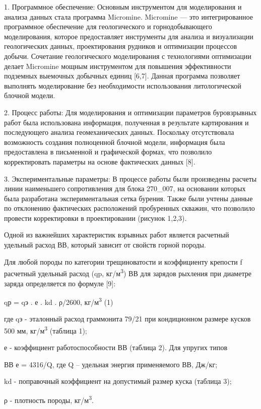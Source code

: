 \begin{multicols}{2}
1. Программное обеспечение: Основным инструментом для моделирования и
анализа данных стала программа Micromine. Micromine --- это
интегрированное программное обеспечение для геологического и
горнодобывающего моделирования, которое предоставляет инструменты для
анализа и визуализации геологических данных, проектирования рудников и
оптимизации процессов добычи. Сочетание геологического моделирования с
технологиями оптимизации делает Micromine мощным инструментом для
повышения эффективности подземных выемочных добычных единиц {[}6,7{]}.
Данная программа позволяет выполнять моделирование без необходимости
использования литологической блочной модели.

2. Процесс работы: Для моделирования и оптимизации параметров
буровзрывных работ была использована информация, полученная в результате
картирования и последующего анализа геомеханических данных. Поскольку
отсутствовала возможность создания полноценной блочной модели,
информация была предоставлена в письменной и графической формах, что
позволило корректировать параметры на основе фактических данных {[}8{]}.

3. Экспериментальные параметры: В процессе работы были произведены
расчеты линии наименьшего сопротивления для блока 270\_007, на основании
которых была разработана экспериментальная сетка бурения. Также были
учтены данные по отклонению фактических расположений пробуренных
скважин, что позволило провести корректировки в проектировании (рисунок
1,2,3).

Одной из важнейших характеристик взрывных работ является расчетный
удельный расход ВВ, который зависит от свойств горной породы.

Для любой породы по категории трещиноватости и коэффициенту крепости f
расчетный удельный расход (qp, кг/м\textsuperscript{3}) ВВ для зарядов
рыхления при диаметре заряда определяется по формуле {[}9{]}:

\hspace{1em} qр = qэ . е . kd . ρ/2600, кг/м\textsuperscript{3} (1)

где qэ - эталонный расход граммонита 79/21 при кондиционном размере
кусков 500 мм, кг/м\textsuperscript{3} (таблица 1);

е - коэффициент работоспособности ВВ (таблица 2). Для упругих типов

ВВ е = 4316/Q, где Q -- удельная энергия применяемого ВВ, Дж/кг;

kd - поправочный коэффициент на допустимый размер куска (таблица 3);

ρ - плотность породы, кг/м\textsuperscript{3}.
\end{multicols}


